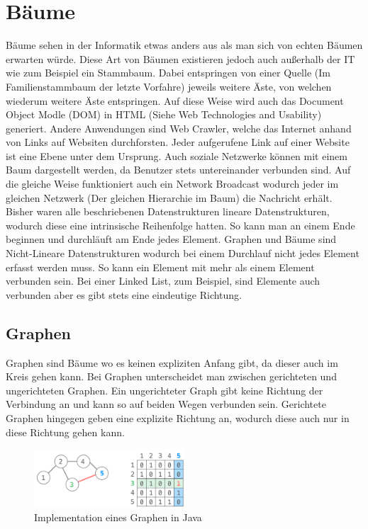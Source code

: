 \documentclass{article}
\begin{document}
	\section{Bäume}
	Bäume sehen in der Informatik etwas anders aus als man sich von echten Bäumen erwarten würde. Diese Art von Bäumen existieren jedoch auch außerhalb der IT wie zum Beispiel ein Stammbaum. Dabei entspringen von einer Quelle (Im Familienstammbaum der letzte Vorfahre) jeweils weitere Äste, von welchen wiederum weitere Äste entspringen. Auf diese Weise wird auch das Document Object Modle (DOM) in HTML (Siehe Web Technologies and Usability) generiert. Andere Anwendungen sind Web Crawler, welche das Internet anhand von Links auf Websiten durchforsten. Jeder aufgerufene Link auf einer Website ist eine Ebene unter dem Ursprung. Auch soziale Netzwerke können mit einem Baum dargestellt werden, da Benutzer stets untereinander verbunden sind. Auf die gleiche Weise funktioniert auch ein Network Broadcast wodurch jeder im gleichen Netzwerk (Der gleichen Hierarchie im Baum) die Nachricht erhält. \\
	Bisher waren alle beschriebenen Datenstrukturen lineare Datenstrukturen, wodurch diese eine intrinsische Reihenfolge hatten. So kann man an einem Ende beginnen und durchläuft am Ende jedes Element. Graphen und Bäume sind Nicht-Lineare Datenstrukturen wodurch bei einem Durchlauf nicht jedes Element erfasst werden muss. So kann ein Element mit mehr als einem Element verbunden sein. Bei einer Linked List, zum Beispiel, sind Elemente auch verbunden aber es gibt stets eine eindeutige Richtung.
	\subsection{Graphen}
	Graphen sind Bäume wo es keinen expliziten Anfang gibt, da dieser auch im Kreis gehen kann. Bei Graphen unterscheidet man zwischen gerichteten und ungerichteten Graphen. Ein ungerichteter Graph gibt keine Richtung der Verbindung an und kann so auf beiden Wegen verbunden sein. Gerichtete Graphen hingegen geben eine explizite Richtung an, wodurch diese auch nur in diese Richtung gehen kann.
	\begin{figure}
	\includegraphics[width=0.5\textwidth]{Bilder/graph.png}
	\caption{Implementation eines Graphen in Java}
	\end{figure}
\end{document}
